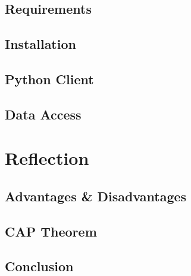 \subsection{Requirements} \label{subsec:requirementsHazelcast}
\subsection{Installation} \label{subsec:installationHazelcast}
\subsection{Python Client} \label{subsec:pythonClientHazelcast}
\subsection{Data Access} \label{subsec:dataAccessHazelcast}

\section{Reflection} \label{sec:reflectionHazelcast}
\subsection{Advantages \& Disadvantages} \label{subsec:advantagesDisadvantagesHazelcast}
\subsection{CAP Theorem} \label{subsec:capTheoremHazelcast}
\subsection{Conclusion} \label{subsec:conclusionHazelcast}

